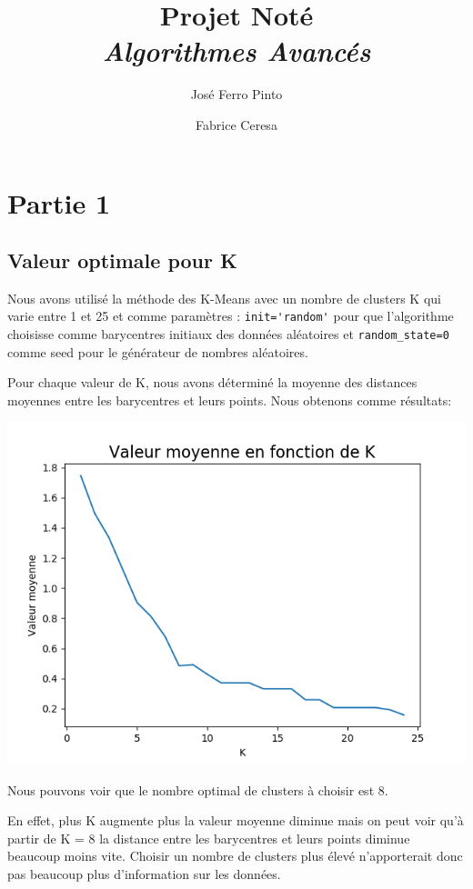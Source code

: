 \documentclass[a4paper,10pt]{article}
\title{Projet Noté\\
\large\emph{Algorithmes Avancés}}
\author{José Ferro Pinto\and Fabrice Ceresa}
\begin{document}
\maketitle

\section{Partie 1}  
    \subsection{Valeur optimale pour K}
        Nous avons utilisé la méthode des K-Means avec un nombre de clusters K qui varie entre 1 et 25 et comme paramètres : \verb?init='random'? pour que l’algorithme choisisse comme barycentres initiaux des données aléatoires et \verb?random_state=0? comme seed pour le générateur de nombres aléatoires.
        
        Pour chaque valeur de K, nous avons déterminé la moyenne des distances moyennes entre les barycentres et leurs points. Nous obtenons comme résultats:
        
        \begin{center}
            \includegraphics{p1-1}
        \end{center}
        
        Nous pouvons voir que le nombre optimal de clusters à choisir est 8.
        
        \pagebreak
        
        En effet, plus K augmente plus la valeur moyenne diminue mais on peut voir qu’à partir de K = 8 la distance entre les barycentres et leurs points diminue beaucoup moins vite. Choisir un nombre de clusters plus élevé n’apporterait donc pas beaucoup plus d’information sur les données.
        
\end{document}
